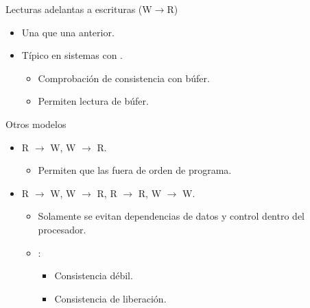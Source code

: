 \begin{frame}[t]{Lecturas adelantas a escrituras (W$\rightarrow$R)}
\begin{itemize}
  \item Una   
        que una  anterior.

  \item Típico en sistemas con .
    \begin{itemize}
      \item Comprobación de consistencia con búfer.
      \item Permiten lectura de búfer.
    \end{itemize}
\end{itemize}
\end{frame}

\begin{frame}[t]{Otros modelos}
\begin{itemize}
  \item R $\rightarrow$ W, W $\rightarrow$ R.
    \begin{itemize}
      \item Permiten que las  
             fuera de orden de programa.
    \end{itemize}

  \item R $\rightarrow$ W, 
        W $\rightarrow$ R, 
        R $\rightarrow$ R, 
        W $\rightarrow$ W.
    \begin{itemize}
      \item Solamente se evitan dependencias de datos y control dentro del procesador.
      \item {}:
        \begin{itemize}
          \item Consistencia débil.
          \item Consistencia de liberación.
        \end{itemize}
    \end{itemize}
\end{itemize}
\end{frame}

